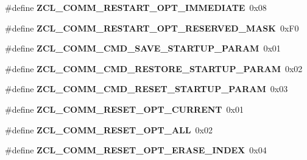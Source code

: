 \begin{DoxyCompactItemize}
\item 
\mbox{\label{group__zcl__commissioning_ga817f8447ac8d34320148d87d29083eb9}} 
\#define {\bfseries Z\+C\+L\+\_\+\+C\+O\+M\+M\+\_\+\+R\+E\+S\+T\+A\+R\+T\+\_\+\+O\+P\+T\+\_\+\+I\+M\+M\+E\+D\+I\+A\+TE}~0x08
\item 
\mbox{\label{group__zcl__commissioning_ga99c15c34e5e1845ed2d8fb4285509b21}} 
\#define {\bfseries Z\+C\+L\+\_\+\+C\+O\+M\+M\+\_\+\+R\+E\+S\+T\+A\+R\+T\+\_\+\+O\+P\+T\+\_\+\+R\+E\+S\+E\+R\+V\+E\+D\+\_\+\+M\+A\+SK}~0x\+F0
\item 
\mbox{\label{group__zcl__commissioning_ga55f8c0b2f1ff543e2db57d0d0061d378}} 
\#define {\bfseries Z\+C\+L\+\_\+\+C\+O\+M\+M\+\_\+\+C\+M\+D\+\_\+\+S\+A\+V\+E\+\_\+\+S\+T\+A\+R\+T\+U\+P\+\_\+\+P\+A\+R\+AM}~0x01
\item 
\mbox{\label{group__zcl__commissioning_gae26e4c1daf77b1b227a34ec10f8fbca0}} 
\#define {\bfseries Z\+C\+L\+\_\+\+C\+O\+M\+M\+\_\+\+C\+M\+D\+\_\+\+R\+E\+S\+T\+O\+R\+E\+\_\+\+S\+T\+A\+R\+T\+U\+P\+\_\+\+P\+A\+R\+AM}~0x02
\item 
\mbox{\label{group__zcl__commissioning_gabba1a2fe6591ee8038fec2e191eca9b8}} 
\#define {\bfseries Z\+C\+L\+\_\+\+C\+O\+M\+M\+\_\+\+C\+M\+D\+\_\+\+R\+E\+S\+E\+T\+\_\+\+S\+T\+A\+R\+T\+U\+P\+\_\+\+P\+A\+R\+AM}~0x03
\item 
\mbox{\label{group__zcl__commissioning_ga087ee46259b56cfcf97b32e7d1e1452b}} 
\#define {\bfseries Z\+C\+L\+\_\+\+C\+O\+M\+M\+\_\+\+R\+E\+S\+E\+T\+\_\+\+O\+P\+T\+\_\+\+C\+U\+R\+R\+E\+NT}~0x01
\item 
\mbox{\label{group__zcl__commissioning_ga5079436c4ae18d83818e6b0b60547950}} 
\#define {\bfseries Z\+C\+L\+\_\+\+C\+O\+M\+M\+\_\+\+R\+E\+S\+E\+T\+\_\+\+O\+P\+T\+\_\+\+A\+LL}~0x02
\item 
\mbox{\label{group__zcl__commissioning_ga63e2335a40e97cd04926ac430068a672}} 
\#define {\bfseries Z\+C\+L\+\_\+\+C\+O\+M\+M\+\_\+\+R\+E\+S\+E\+T\+\_\+\+O\+P\+T\+\_\+\+E\+R\+A\+S\+E\+\_\+\+I\+N\+D\+EX}~0x04
\item 

\end{DoxyCompactItemize}
